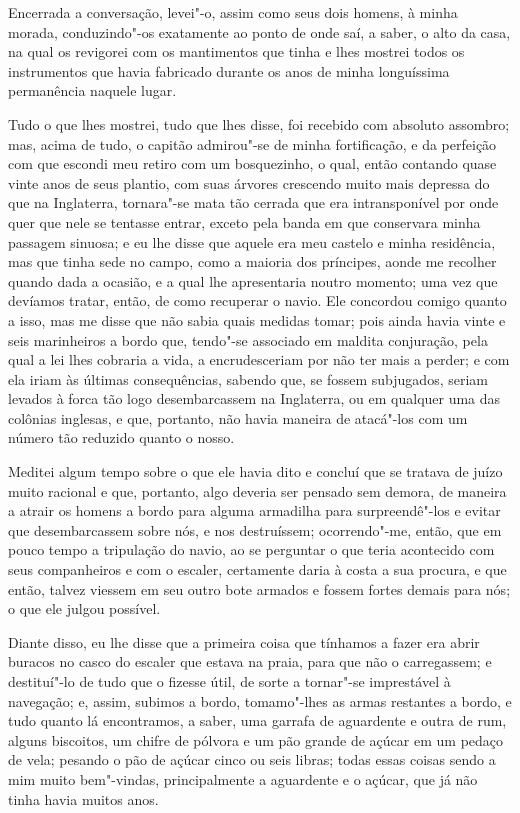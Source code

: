 Encerrada a conversação, levei"-o, assim como seus dois homens, à minha
morada, conduzindo"-os exatamente ao ponto de onde saí, a saber, o alto
da casa, na qual os revigorei com os mantimentos que tinha e lhes
mostrei todos os instrumentos que havia fabricado durante os anos de
minha longuíssima permanência naquele lugar.

Tudo o que lhes mostrei, tudo que lhes disse, foi recebido com absoluto
assombro; mas, acima de tudo, o capitão admirou"-se de minha
fortificação, e da perfeição com que escondi meu retiro com um
bosquezinho, o qual, então contando quase vinte anos de seus plantio,
com suas árvores crescendo muito mais depressa do que na Inglaterra,
tornara"-se mata tão cerrada que era intransponível por onde quer que
nele se tentasse entrar, exceto pela banda em que conservara minha
passagem sinuosa; e eu lhe disse que aquele era meu castelo e minha
residência, mas que tinha sede no campo, como a maioria dos príncipes,
aonde me recolher quando dada a ocasião, e a qual lhe apresentaria
noutro momento; uma vez que devíamos tratar, então, de como recuperar o
navio. Ele concordou comigo quanto a isso, mas me disse que não sabia
quais medidas tomar; pois ainda havia vinte e seis marinheiros a bordo
que, tendo"-se associado em maldita conjuração, pela qual a lei lhes
cobraria a vida, a encrudesceriam por não ter mais a perder; e com ela
iriam às últimas consequências, sabendo que, se fossem subjugados,
seriam levados à forca tão logo desembarcassem na Inglaterra, ou em
qualquer uma das colônias inglesas, e que, portanto, não havia maneira
de atacá"-los com um número tão reduzido quanto o nosso.

Meditei algum tempo sobre o que ele havia dito e concluí que se tratava
de juízo muito racional e que, portanto, algo deveria ser pensado sem
demora, de maneira a atrair os homens a bordo para alguma armadilha para
surpreendê"-los e evitar que desembarcassem sobre nós, e nos destruíssem;
ocorrendo"-me, então, que em pouco tempo a tripulação do navio, ao se
perguntar o que teria acontecido com seus companheiros e com o escaler,
certamente daria à costa a sua procura, e que então, talvez viessem em
seu outro bote armados e fossem fortes demais para nós; o que ele julgou
possível.

Diante disso, eu lhe disse que a primeira coisa que tínhamos a fazer era
abrir buracos no casco do escaler que estava na praia, para que não o
carregassem; e destituí"-lo de tudo que o fizesse útil, de sorte a
tornar"-se imprestável à navegação; e, assim, subimos a bordo,
tomamo"-lhes as armas restantes a bordo, e tudo quanto lá encontramos, a
saber, uma garrafa de aguardente e outra de rum, alguns biscoitos, um
chifre de pólvora e um pão grande de açúcar em um pedaço de vela;
pesando o pão de açúcar cinco ou seis libras; todas essas coisas sendo a
mim muito bem"-vindas, principalmente a aguardente e o açúcar, que já não
tinha havia muitos anos.

